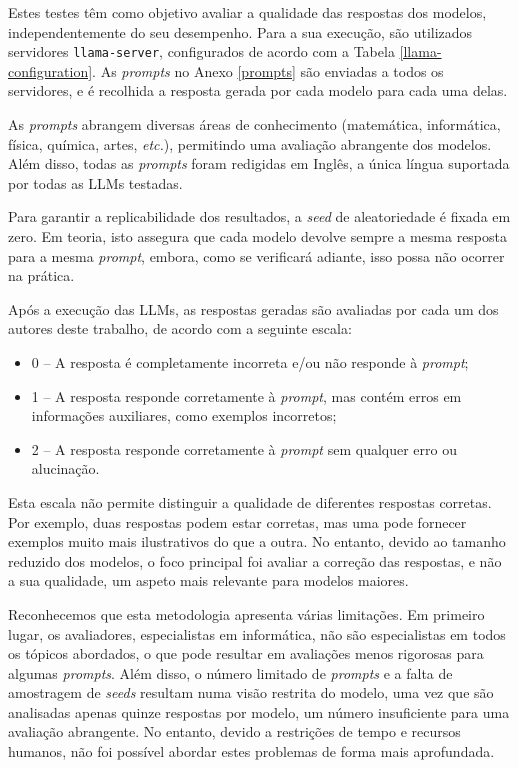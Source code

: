 \documentclass[11pt, a4paper]{article}
\begin{document}
Estes testes têm como objetivo avaliar a qualidade das respostas dos modelos, independentemente do
seu desempenho. Para a sua execução, são utilizados servidores \texttt{llama-server}, configurados
de acordo com a Tabela \ref{llama-configuration}. As \emph{prompts} no Anexo \ref{prompts} são
enviadas a todos os servidores, e é recolhida a resposta gerada por cada modelo para cada uma delas.

As \emph{prompts} abrangem diversas áreas de conhecimento (matemática, informática, física, química,
artes, \emph{etc.}), permitindo uma avaliação abrangente dos modelos. Além disso, todas as
\emph{prompts} foram redigidas em Inglês, a única língua suportada por todas as LLMs testadas.

Para garantir a replicabilidade dos resultados, a \emph{seed} de aleatoriedade é fixada em zero. Em
teoria, isto assegura que cada modelo devolve sempre a mesma resposta para a mesma \emph{prompt},
embora, como se verificará adiante, isso possa não ocorrer na prática.

Após a execução das LLMs, as respostas geradas são avaliadas por cada um dos autores deste trabalho,
de acordo com a seguinte escala:

\begin{itemize}
    \item 0 -- A resposta é completamente incorreta e/ou não responde à \emph{prompt};
    \item 1 -- A resposta responde corretamente à \emph{prompt}, mas contém erros em informações
               auxiliares, como exemplos incorretos;
    \item 2 -- A resposta responde corretamente à \emph{prompt} sem qualquer erro ou alucinação.
\end{itemize}

Esta escala não permite distinguir a qualidade de diferentes respostas corretas. Por exemplo, duas
respostas podem estar corretas, mas uma pode fornecer exemplos muito mais ilustrativos do que a
outra. No entanto, devido ao tamanho reduzido dos modelos, o foco principal foi avaliar a correção
das respostas, e não a sua qualidade, um aspeto mais relevante para modelos maiores.

Reconhecemos que esta metodologia apresenta várias limitações. Em primeiro lugar, os avaliadores,
especialistas em informática, não são especialistas em todos os tópicos abordados, o que pode
resultar em avaliações menos rigorosas para algumas \emph{prompts}. Além disso, o número limitado de
\emph{prompts} e a falta de amostragem de \emph{seeds} resultam numa visão restrita do modelo, uma
vez que são analisadas apenas quinze respostas por modelo, um número insuficiente para uma avaliação
abrangente. No entanto, devido a restrições de tempo e recursos humanos, não foi possível abordar
estes problemas de forma mais aprofundada.
\end{document}
